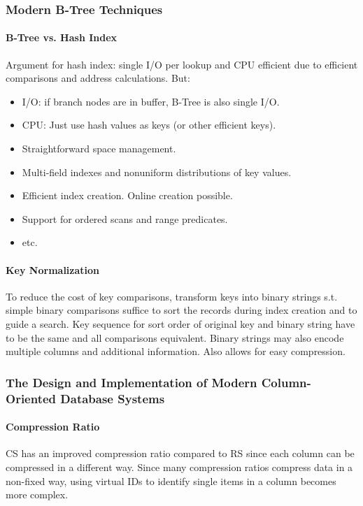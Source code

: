 \subsubsection{Modern B-Tree Techniques}


\paragraph{B-Tree vs. Hash Index}
Argument for hash index: single I/O per lookup and CPU efficient due to efficient comparisons and address calculations. But:
\begin{itemize}
    \item I/O: if branch nodes are in buffer, B-Tree is also single I/O.
    \item CPU: Just use hash values as keys (or other efficient keys).
    \item Straightforward space management.
    \item Multi-field indexes and nonuniform distributions of key values.
    \item Efficient index creation. Online creation possible.
    \item Support for ordered scans and range predicates.
    \item etc.
\end{itemize}

\paragraph{Key Normalization}
To reduce the cost of key comparisons, transform keys into binary strings s.t. simple binary comparisons suffice to sort the records during index creation and to guide a search. Key sequence for sort order of original key and binary string have to be the same and all comparisons equivalent. Binary strings may also encode multiple columns and additional information. Also allows for easy compression. %





\subsubsection{The Design and Implementation of Modern Column-Oriented Database Systems}

\paragraph{Compression Ratio}
CS has an improved compression ratio compared to RS since each column can be compressed in a different way. Since many compression ratios compress data in a non-fixed way, using virtual IDs to identify single items in a column becomes more complex.

